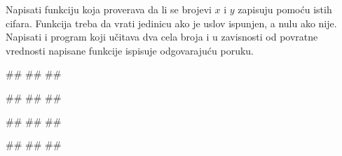 \begin{Exercise}[label=FUN_15] 
Napisati funkciju  koja proverava da li
se brojevi $x$ i $y$ zapisuju pomoću istih cifara. Funkcija treba da
vrati jedinicu ako je uslov ispunjen, a nulu ako nije. Napisati i
program koji učitava dva cela broja i u zavisnosti od povratne vrednosti
napisane funkcije ispisuje odgovarajuću poruku.
 
\begin{miditest}
\begin{upotreba}{1}
#\naslovInt#
##
##
\end{upotreba}
\end{miditest}
\begin{miditest}
\begin{upotreba}{2}
#\naslovInt#
##
##
\end{upotreba}
\end{miditest}

\begin{miditest}
\begin{upotreba}{3}
#\naslovInt#
##
##
\end{upotreba}
\end{miditest}
\begin{miditest}
\begin{upotreba}{4}
#\naslovInt#
##
##
\end{upotreba}
\end{miditest} 

\end{Exercise}
\ifresenja 
\begin{Answer}[ref=FUN_15]
\end{Answer} 
\fi


